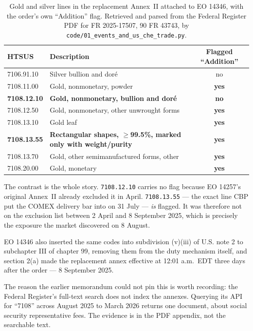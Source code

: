\documentclass[11pt,a4paper]{article}
\begin{document}
\begin{table}[h]
\centering
\begin{tabular}{@{}llc@{}}
\toprule
\textbf{HTSUS} & \textbf{Description} & \textbf{Flagged ``Addition''} \\
\midrule
7106.91.10 & Silver bullion and dor\'e & no \\
7108.11.00 & Gold, nonmonetary, powder & \textbf{yes} \\
\textbf{7108.12.10} & \textbf{Gold, nonmonetary, bullion and dor\'e} & \textbf{no} \\
7108.12.50 & Gold, nonmonetary, other unwrought forms & \textbf{yes} \\
7108.13.10 & Gold leaf & \textbf{yes} \\
\textbf{7108.13.55} & \textbf{Rectangular shapes, $\geq$99.5\%, marked only with weight/purity} & \textbf{yes} \\
7108.13.70 & Gold, other semimanufactured forms, other & \textbf{yes} \\
7108.20.00 & Gold, monetary & \textbf{yes} \\
\bottomrule
\end{tabular}
\caption{Gold and silver lines in the replacement Annex~II attached to EO 14346, with the
order's own ``Addition'' flag. Retrieved and parsed from the Federal Register PDF for FR
2025-17507, 90 FR 43743, by \texttt{code/01\_events\_and\_us\_che\_trade.py}.}
\label{tab:annex}
\end{table}

The contrast is the whole story. \texttt{7108.12.10} carries no flag because EO 14257's original
Annex~II already excluded it in April. \texttt{7108.13.55} --- the exact line CBP put the COMEX
delivery bar into on 31 July --- \emph{is} flagged. It was therefore not on the exclusion list
between 2 April and 8 September 2025, which is precisely the exposure the market discovered on
8 August.

EO 14346 also inserted the same codes into subdivision (v)(iii) of U.S. note 2 to subchapter III
of chapter 99, removing them from the duty mechanism itself, and section 2(a) made the
replacement annex effective at 12:01 a.m.\ EDT three days after the order --- 8 September 2025.

The reason the earlier memorandum could not pin this is worth recording: the Federal Register's
full-text search does not index the annexes. Querying its API for ``7108'' across August 2025 to
March 2026 returns one document, about social security representative fees. The evidence is in
the PDF appendix, not the searchable text.
\end{document}
